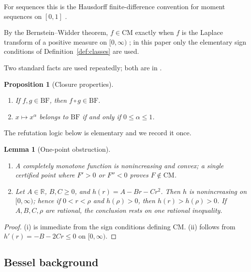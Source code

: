 \documentclass[preprint,12pt]{elsarticle}
\theoremstyle{plain}
\newtheorem{lemma}[theorem]{Lemma}
\newtheorem{proposition}[theorem]{Proposition}
\theoremstyle{definition}
\theoremstyle{remark}
\newcommand{\R}{\mathbb{R}}
\newcommand{\CM}{\mathrm{CM}}
\newcommand{\BF}{\mathrm{BF}}
\begin{document}
\noindent
For sequences this is the Hausdorff finite-difference convention for moment
sequences on \([0,1]\) \cite{hausdorff,widder}.

\noindent
By the Bernstein--Widder theorem, \(f\in\CM\) exactly when \(f\) is the
Laplace transform of a positive measure on \([0,\infty)\)
\cite{widder,schilling-song-vondracek}; in this paper only the elementary
sign conditions of Definition~\ref{def:classes} are used.

\noindent
Two standard facts are used repeatedly; both are in
\cite{schilling-song-vondracek}.

\begin{proposition}[Closure properties]\label{prop:closure}
\begin{enumerate}[label=\textup{(\roman*)},leftmargin=2.3em]
\item If \(f,g\in\BF\), then \(f\circ g\in\BF\).
\item \(x\mapsto x^\alpha\) belongs to \(\BF\) if and only if
\(0\le\alpha\le1\).
\end{enumerate}
\end{proposition}

\noindent
The refutation logic below is elementary and we record it once.

\begin{lemma}[One-point obstruction]\label{lem:one-point}
\begin{enumerate}[label=\textup{(\roman*)},leftmargin=2.3em]
\item A completely monotone function is nonincreasing and convex; a single
certified point where \(F'>0\) or \(F''<0\) proves \(F\notin\CM\).
\item Let \(A\in\R\), \(B,C\ge0\), and \(h(r)=A-Br-Cr^2\). Then \(h\) is
nonincreasing on \([0,\infty)\); hence if \(0<r<\rho\) and \(h(\rho)>0\), then
\(h(r)>h(\rho)>0\). If \(A,B,C,\rho\) are rational, the conclusion rests on
one rational inequality.
\end{enumerate}
\end{lemma}
\begin{proof}
(i) is immediate from the sign conditions defining \(\CM\). (ii) follows from
\(h'(r)=-B-2Cr\le0\) on \([0,\infty)\).
\end{proof}

\subsection{Bessel background}
\end{document}
